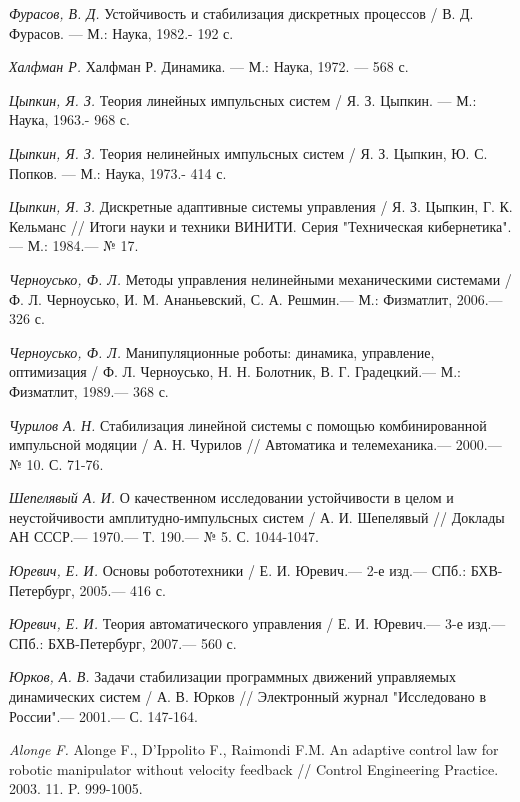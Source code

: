 \begin{thebibliography}{10}
	{\it Фурасов, В. Д.} Устойчивость и стабилизация дискретных процессов /
	В. Д. Фурасов. — М.: Наука, 1982.- 192 с.
	
	{\it Халфман Р.} Халфман Р. Динамика. — М.: Наука, 1972. — 568 с.
	
	{\it Цыпкин, Я. З.} Теория линейных импульсных систем /
	Я. З. Цыпкин. — М.: Наука, 1963.- 968 с.
	
	{\it Цыпкин, Я. З.} Теория нелинейных импульсных систем /
	Я. З. Цыпкин, Ю. С. Попков. — М.: Наука, 1973.- 414 с.
	
	{\it Цыпкин, Я. З.} Дискретные адаптивные системы управления /
	Я. З. Цыпкин, Г. К. Кельманс // Итоги науки и техники ВИНИТИ. Серия "Техническая кибернетика". — М.: 1984.— № 17.
	
	{\it Черноусько, Ф. Л.} Методы управления нелинейными механическими системами /
	Ф. Л. Черноусько, И. М. Ананьевский, С. А. Решмин.— М.: Физматлит, 2006.— 326 с.
	
	{\it Черноусько, Ф. Л.} Манипуляционные роботы: динамика, управление, оптимизация /
	Ф. Л. Черноусько, Н. Н. Болотник, В. Г. Градецкий.— М.: Физматлит, 1989.— 368 с.
	
	{\it Чурилов А. Н.} Стабилизация линейной системы с помощью комбинированной импульсной модяции /
	А. Н. Чурилов // Автоматика и телемеханика.— 2000.— № 10. С. 71-76.
	
	{\it Шепелявый А. И.} О качественном исследовании устойчивости в целом и неустойчивости амплитудно-импульсных систем /
	А. И. Шепелявый // Доклады АН СССР.— 1970.— Т. 190.— № 5. С. 1044-1047.
	
	
	{\it Юревич, Е. И.} Основы робототехники / Е. И. Юревич.— 2-е изд.— СПб.:
	БХВ-Петербург, 2005.— 416 с.
	
	{\it Юревич, Е. И.} Теория автоматического управления / Е. И. Юревич.— 3-е изд.— СПб.:
	БХВ-Петербург, 2007.— 560 с.
	
	{\it Юрков, А. В.} Задачи стабилизации программных движений управляемых динамических систем / А. В. Юрков // Электронный журнал "Исследовано в России".— 2001.— С. 147-164.
	
	{\it Alonge F.} Alonge F., D’Ippolito F., Raimondi F.M. An adaptive control law for robotic manipulator without velocity feedback // Control Engineering Practice. 2003. 11. P. 999-1005.
	

\end{thebibliography}
